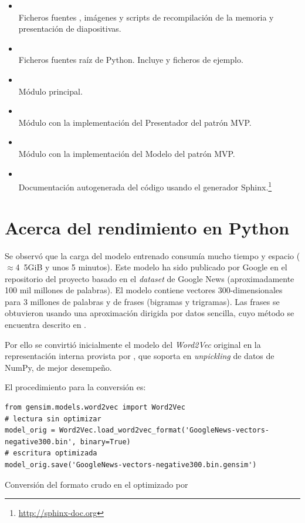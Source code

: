 \begin{itemize}
\item[] \\
Ficheros fuentes \XeLaTeX, imágenes y scripts de recompilación de la memoria y presentación de diapositivas.
\item[] \\
Ficheros fuentes raíz de Python. Incluye  y ficheros de ejemplo.
\item[] \\
Módulo principal.
\item[] \\
Módulo  con la implementación del Presentador del patrón MVP.
\item[] \\
Módulo  con la implementación del Modelo del patrón MVP.
\item[] \\
Documentación autogenerada del código usando el generador Sphinx.\footnote{\url{http://sphinx-doc.org}}
\end{itemize}

\FloatBarrier
\section{Acerca del rendimiento en Python}

Se observó que la carga del modelo entrenado  consumía mucho tiempo y espacio ($\approx$\si{4.5}{GiB} y unos 5 minutos). Este modelo ha sido publicado por Google en el repositorio del proyecto  basado en el \emph{dataset} de Google News (aproximadamente 100 mil millones de palabras). El modelo contiene vectores 300-dimensionales para 3 millones de palabras y de frases (bigramas y trigramas). Las frases se obtuvieron usando una aproximación dirigida por datos sencilla, cuyo método se encuentra descrito en \cite{DBLP:journals/corr/MikolovSCCD13}.

Por ello se convirtió inicialmente el modelo del \emph{Word2Vec} original en la representación interna provista por , que soporta en \emph{unpickling} de datos de NumPy, de mejor desempeño.

El procedimiento para la conversión es:
\nopagebreak
\begin{listing}[H]
\begin{verbatim}
from gensim.models.word2vec import Word2Vec
# lectura sin optimizar
model_orig = Word2Vec.load_word2vec_format('GoogleNews-vectors-negative300.bin', binary=True)
# escritura optimizada
model_orig.save('GoogleNews-vectors-negative300.bin.gensim')
\end{verbatim}
\caption{Conversión del formato crudo  en el optimizado por }
\label{lst:word2vec-convert}
\end{listing}

